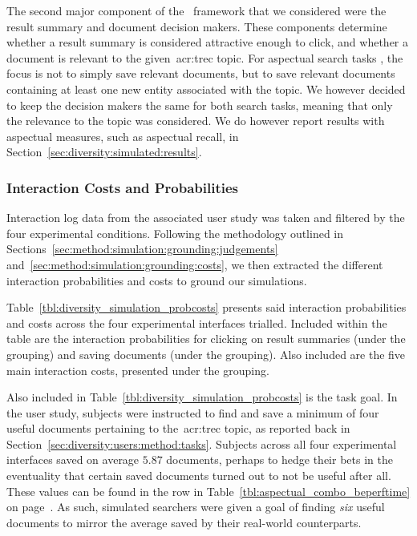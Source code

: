 The second major component of the \simiir~framework that we considered were the result summary and document decision makers. These components determine whether a result summary is considered attractive enough to click, and whether a document is relevant to the given~\gls{acr:trec} topic. For aspectual search tasks , the focus is not to simply save relevant documents, but to save relevant documents containing at least one new entity associated with the topic. We however decided to keep the decision makers the same for both search tasks, meaning that only the relevance to the topic was considered. We do however report results with aspectual measures, such as aspectual recall, in Section~\ref{sec:diversity:simulated:results}.

\subsubsection{Interaction Costs and Probabilities}\label{sec:diversity:simulated:method:probscosts}
Interaction log data from the associated user study was taken and filtered by the four experimental conditions. Following the methodology outlined in Sections~\ref{sec:method:simulation:grounding:judgements} and~\ref{sec:method:simulation:grounding:costs}, we then extracted the different interaction probabilities and costs to ground our simulations.

Table~\ref{tbl:diversity_simulation_probcosts} presents said interaction probabilities and costs across the four experimental interfaces trialled. Included within the table are the interaction probabilities for clicking on result summaries (under the  grouping) and saving documents (under the  grouping). Also included are the five main interaction costs, presented under the  grouping.

Also included in Table~\ref{tbl:diversity_simulation_probcosts} is the task goal. In the user study, subjects were instructed to find and save a minimum of four useful documents pertaining to the~\gls{acr:trec} topic, as reported back in Section~\ref{sec:diversity:users:method:tasks}. Subjects across all four experimental interfaces saved on average $5.87$ documents, perhaps to hedge their bets in the eventuality that certain saved documents turned out to not be useful after all. These values can be found in the  row in Table~\ref{tbl:aspectual_combo_beperftime} on page~\pageref{tbl:aspectual_combo_beperftime}. As such, simulated searchers were given a goal of finding \emph{six} useful documents to mirror the average saved by their real-world counterparts.

